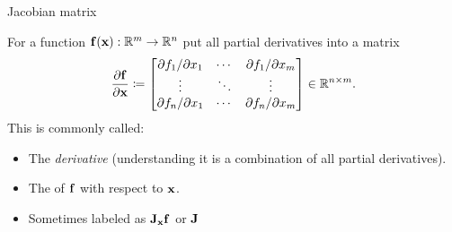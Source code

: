 \documentclass[8pt, aspectratio=149]{beamer}
\begin{document}
\begin{frame}{Jacobian matrix}

    For a function \( \mVector{f}(\mVector{x}) : \R^m \to \R^n \)
    put all partial derivatives into a matrix 
    \begin{align*}
        \frac{\partial \mVector{f}}{\partial \mVector{x}} 
        \coloneqq 
        \begin{bmatrix}
            \partial f_1 / \partial x_1 & \cdots & \partial f_1 / \partial x_m \\ 
            \vdots & \ddots & \vdots \\ 
            \partial f_n / \partial x_1 & \cdots & \partial f_n / \partial x_m \\ 
        \end{bmatrix} 
        \in \R^{n \times m}. 
    \end{align*}
    This is commonly called: 
    \begin{itemize}
        \item The \textit{derivative} (understanding it is a combination of all partial derivatives). 
        \item The \textit{\Jacobian} of \( \mVector{f} \) with respect to \( \mVector{x} \).   
        \item Sometimes labeled as \( \mMatrix{J}_{\mVector{x}}\mVector{f} \) or \( \mVector{J} \) 
    \end{itemize}

    \vspace{1em}

\end{frame}
\end{document}
